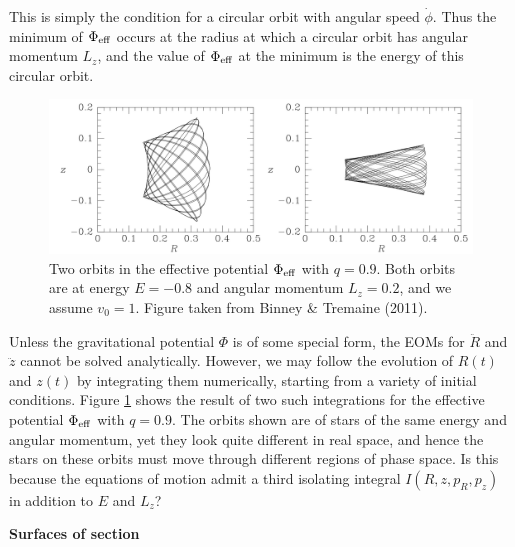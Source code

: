 \documentclass[a4paper,10pt]{article}
\begin{document}
{\noindent}This is simply the condition for a circular orbit with angular speed $\dot{\phi}$. Thus the minimum of $\Phi_{\rm eff}$ occurs at the radius at which a circular orbit has angular momentum $L_z$, and the value of $\Phi_{\rm eff}$ at the minimum is the energy of this circular orbit.

\begin{figure}[t]
    \centering
    \includegraphics[width=16cm]{figures/AxisymmOrbits.png}
    \caption{\footnotesize{Two orbits in the effective potential $\Phi_{\rm eff}$ with $q=0.9$. Both orbits are at energy $E=−0.8$ and angular momentum $L_z=0.2$, and we assume $v_0=1$. Figure taken from Binney \& Tremaine (2011).}}
    \label{fig:axisymmorbits}
\end{figure}

{\noindent}Unless the gravitational potential $\Phi$ is of some special form, the EOMs for $\ddot{R}$ and $\ddot{z}$ cannot be solved analytically. However, we may follow the evolution of $R(t)$ and $z(t)$ by integrating them numerically, starting from a variety of initial conditions. Figure \ref{fig:axisymmorbits} shows the result of two such integrations for the effective potential $\Phi_{\rm eff}$ with $q=0.9$. The orbits shown are of stars of the same energy and angular momentum, yet they look quite different in real space, and hence the stars on these orbits must move through different regions of phase space. Is this because the equations of motion admit a third isolating integral $I(R,z,p_R,p_z)$ in addition to $E$ and $L_z$?

{\noindent}\textbf{Surfaces of section}
\end{document}
